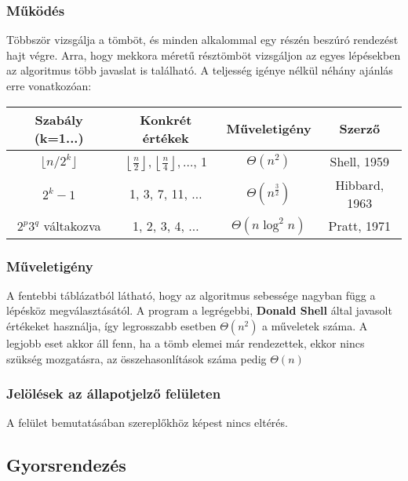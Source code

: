 \documentclass{elteikthesis}
\begin{document}
\subsubsection{Működés}
Többször vizsgálja a tömböt, és minden alkalommal egy részén beszúró rendezést hajt végre. Arra, hogy mekkora méretű résztömböt vizsgáljon az egyes lépésekben az algoritmus több javaslat is található. A teljesség igénye nélkül néhány ajánlás\cite{ShellWiki} erre vonatkozóan:\par
\begin{table}[h]
	\def\arraystretch{2}
	\centering
	\begin{tabular}{|c|c|c|c|}
		\hline
		\textbf{Szabály (k=1...)} & \textbf{Konkrét értékek}  & \textbf{Műveletigény} & \textbf{Szerző}         \\ \hline
		$\lfloor n / 2^k \rfloor$&      $\left\lfloor\frac{n}{2}\right\rfloor,
		\left\lfloor\frac{n}{4}\right\rfloor, \ldots$, 1            &              $\Theta(n^2)$                      & Shell, 1959     \\ \hline
		$2^k-1$&      1, 3, 7, 11, $\ldots$           &              $\Theta(n^\frac{3}{2})$                      & Hibbard, 1963    \\ \hline
		$2^p 3^q$ váltakozva & 1, 2, 3, 4, $\ldots$  &               $\Theta(n \log^2 n)$                     & Pratt, 1971     \\ \hline
	\end{tabular}
\end{table}
\subsubsection{Műveletigény}
 A fentebbi táblázatból látható, hogy az algoritmus sebessége nagyban függ a lépésköz megválasztásától. A program a legrégebbi, \textbf{Donald Shell} által javasolt értékeket\cite{Shell} használja, így legrosszabb esetben $\Theta(n^2)$ a műveletek száma.
 A legjobb eset akkor áll fenn, ha a tömb elemei már rendezettek, ekkor nincs szükség mozgatásra, az összehasonlítások száma pedig $\Theta(n)$
\subsubsection{Jelölések az állapotjelző felületen}
 A felület bemutatásában szereplőkhöz képest nincs eltérés.

\subsection{Gyorsrendezés}
\end{document}
